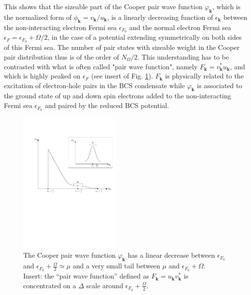 \documentclass[twocolumn,showpacs]{revtex4}
\def\v#1{\mathbf{#1}}
\begin{document}
 
 This shows that the sizeable part of the Cooper pair wave function $\varphi_{\v k}$, which is the normalized form of $\phi_{\v k}=v_{\v k}/u_{\v k}$, is a linearly decreasing function of $\epsilon_{\v k}$ between the non-interacting electron Fermi sea $\epsilon_{F_0}$ and the normal electron Fermi sea  $\epsilon_{F}=\epsilon_{F_0}+\Omega/2$, in the case of a potential extending symmetrically on both sides of this Fermi sea. The number of pair states with sizeable weight in the Cooper pair distribution thus is of the order of $N_\Omega/2$. This understanding  has to be contrasted with what is often called "pair wave function", namely $F_{\v k}=v_{\v k}^*u_{\v k}$, and which is highly peaked on $\epsilon_{F}$ (see insert of Fig. \ref{wavfig}). $F_{\v k}$ is physically related to the excitation of electron-hole pairs in the BCS condensate while $\varphi_{\v k}$ is associated to the ground state of  up and down spin electrons added to the non-interacting Fermi sea $\epsilon_{F_0
 }$ and paired by the reduced  BCS potential.
 \begin{figure}[htbp]
\begin{center}
\includegraphics[width=0.45\textwidth]{wave}
\caption{The Cooper pair wave function $\varphi_{\v{k}}$ has a linear decrease between $\epsilon_{F_0}$ and $\epsilon_{F_0}+\frac{\Omega}{2}\simeq\mu$ and a very small tail between $\mu$ and $\epsilon_{F_0}+\Omega$. \\ Insert: the ``pair wave function'' defined as $F_{\v{k}}=u_{\v{k}}v_{\v{k}}^*$ is concentrated on a $\Delta$ scale around   $\epsilon_{F_0}+\frac{\Omega}{2}$.\label{wavfig}} 

\end{center}
\end{figure}
  
\end{document}
